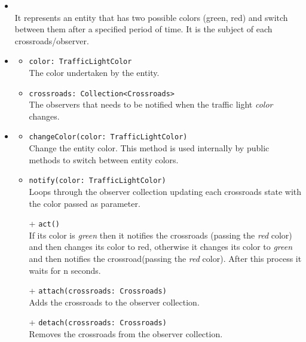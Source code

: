 \begin{itemize}
  \item \textbf{\descr} \\
    It represents an entity that has two possible colors (green, red) and switch
between them after a specified period of time. It is the subject of each 
crossroads/observer.
  \item \textbf{\attrs}
  \begin{itemize}
    \item \texttt{color: TrafficLightColor} \\
The color undertaken by the entity.
    \item \texttt{crossroads: Collection<Crossroads>} \\
The observers that needs to be notified when the traffic light \textit{color} 
changes.
  \end{itemize}
  \item \textbf{\ops}
  \begin{itemize}
    \item \texttt{changeColor(color: TrafficLightColor)} \\
Change the entity color. This method is used internally by public methods to 
switch between entity colors.
    \item \texttt{notify(color: TrafficLightColor)} \\
Loops through the observer collection updating each crossroads state with the 
color passed as parameter. 
    \item[+] \texttt{act()} \\
If its color is \textit{green} then it notifies the crossroads 
(passing the \textit{red} color) and then changes its color to red, 
otherwise it changes its color to \textit{green} and then notifies 
the crossroad(passing the \textit{red} color).
After this process it waits for n seconds.
    \item[+] \texttt{attach(crossroads: Crossroads)} \\
Adds the crossroads to the observer collection.
    \item[+] \texttt{detach(crossroads: Crossroads)} \\
Removes the crossroads from the observer collection.
  \end{itemize}
\end{itemize}
